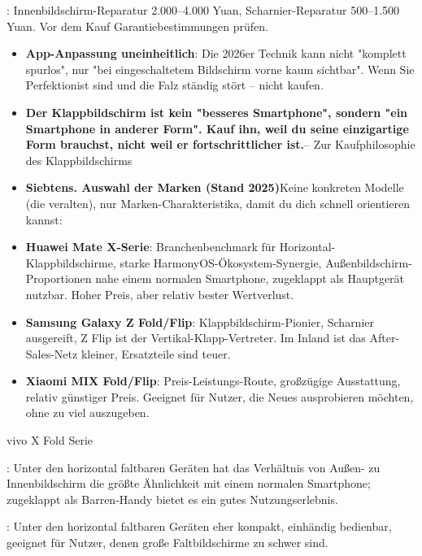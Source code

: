 
: Innenbildschirm-Reparatur 2.000–4.000 Yuan, Scharnier-Reparatur 500–1.500 Yuan. Vor dem Kauf Garantiebestimmungen prüfen.

\begin{itemize}
  \item \textbf{App-Anpassung uneinheitlich}: Die 2026er Technik kann nicht "komplett spurlos", nur "bei eingeschaltetem Bildschirm vorne kaum sichtbar". Wenn Sie Perfektionist sind und die Falz ständig stört – nicht kaufen.
  \item \textbf{Der Klappbildschirm ist kein "besseres Smartphone", sondern "ein Smartphone in anderer Form". Kauf ihn, weil du seine einzigartige Form brauchst, nicht weil er fortschrittlicher ist.}– Zur Kaufphilosophie des Klappbildschirms
  \item \textbf{Siebtens. Auswahl der Marken (Stand 2025)}Keine konkreten Modelle (die veralten), nur Marken-Charakteristika, damit du dich schnell orientieren kannst:
  \item \textbf{Huawei Mate X-Serie}: Branchenbenchmark für Horizontal-Klappbildschirme, starke HarmonyOS-Ökosystem-Synergie, Außenbildschirm-Proportionen nahe einem normalen Smartphone, zugeklappt als Hauptgerät nutzbar. Hoher Preis, aber relativ bester Wertverlust.
  \item \textbf{Samsung Galaxy Z Fold/Flip}: Klappbildschirm-Pionier, Scharnier ausgereift, Z Flip ist der Vertikal-Klapp-Vertreter. Im Inland ist das After-Sales-Netz kleiner, Ersatzteile sind teuer.
  \item \textbf{Xiaomi MIX Fold/Flip}: Preis-Leistungs-Route, großzügige Ausstattung, relativ günstiger Preis. Geeignet für Nutzer, die Neues ausprobieren möchten, ohne zu viel auszugeben.
\end{itemize}

vivo X Fold Serie

: Unter den horizontal faltbaren Geräten hat das Verhältnis von Außen- zu Innenbildschirm die größte Ähnlichkeit mit einem normalen Smartphone; zugeklappt als Barren-Handy bietet es ein gutes Nutzungserlebnis.


: Unter den horizontal faltbaren Geräten eher kompakt, einhändig bedienbar, geeignet für Nutzer, denen große Faltbildschirme zu schwer sind.


